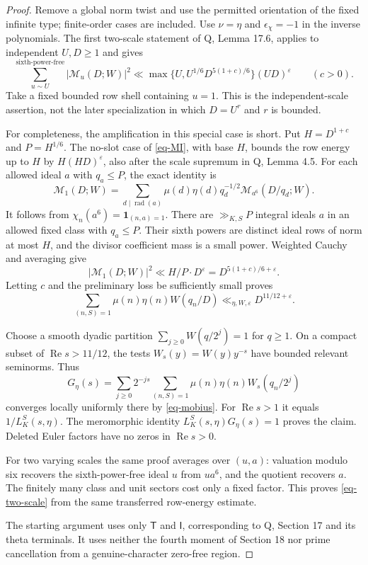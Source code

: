 \documentclass[11pt,a4paper]{article}
\theoremstyle{remark}\newtheorem{remark}[theorem]{Remark}
\newcommand{\Rea}{\operatorname{Re}}
\newcommand{\eps}{\varepsilon}
\newcommand{\one}{\mathbf 1}
\newcommand{\Mcal}{\mathcal M}
\numberwithin{equation}{section}
\begin{document}
\begin{proof}
Remove a global norm twist and use the permitted orientation
of the fixed infinite type; finite-order cases are included. Use $\nu=\eta$ and $\epsilon_\chi=-1$ in the inverse
polynomials. The first two-scale statement of Q, Lemma 17.6, applies
to independent $U,D\ge1$ and gives
\begin{equation}\label{eq-two-scale}
 \sum_{u\sim U}^{\text{sixth-power-free}}
 |\Mcal_u(D;W)|^2
 \ll \max\{U,U^{1/6}D^{5(1+c)/6}\}(UD)^\eps
 \qquad(c>0).
\end{equation}
Take a fixed bounded row shell containing $u=1$. This is the
independent-scale assertion, not the later specialization in which
$D=U^r$ and $r$ is bounded.

For completeness, the amplification in this special case is short.
Put $H=D^{1+c}$ and $P=H^{1/6}$. The no-slot case of
\eqref{eq-MI}, with base $H$, bounds the row energy up to $H$
by $H(HD)^\eps$, also after the scale supremum in Q, Lemma 4.5.
For each allowed ideal $a$ with $q_a\le P$, the exact identity is
\begin{equation}\label{eq-amplification-mask}
 \Mcal_1(D;W)=
 \sum_{d\mid\operatorname{rad}(a)}
       \mu(d)\eta(d)q_d^{-1/2}\Mcal_{a^6}(D/q_d;W).
\end{equation}
It follows from $\chi_n(a^6)=\one_{(n,a)=1}$.
There are $\gg_{K,S}P$ integral ideals $a$ in an allowed
fixed class with $q_a\le P$. Their sixth powers are distinct
ideal rows of norm at most $H$, and the divisor coefficient
mass is a small power. Weighted Cauchy and averaging give
\[
 |\Mcal_1(D;W)|^2\ll H/P\cdot D^\eps
             =D^{5(1+c)/6+\eps}.
\]
Letting $c$ and the preliminary loss be sufficiently small proves
\begin{equation}\label{eq-mobius}
 \sum_{(n,S)=1}\mu(n)\eta(n)W(q_n/D)
       \ll_{\eta,W,\eps}D^{11/12+\eps}.
\end{equation}

Choose a smooth dyadic partition $\sum_{j\ge0}W(q/2^j)=1$
for $q\ge1$. On a compact subset of $\Rea s>11/12$, the tests
$W_s(y)=W(y)y^{-s}$ have bounded relevant seminorms. Thus
\[
 G_\eta(s)=\sum_{j\ge0}2^{-js}
     \sum_{(n,S)=1}\mu(n)\eta(n)W_s(q_n/2^j)
\]
converges locally uniformly there by \eqref{eq-mobius}.
For $\Rea s>1$ it equals $1/L_K^S(s,\eta)$. The meromorphic
identity $L_K^S(s,\eta)G_\eta(s)=1$ proves the claim. Deleted
Euler factors have no zeros in $\Rea s>0$.

For two varying scales the same proof averages over $(u,a)$:
valuation modulo six recovers the sixth-power-free ideal $u$
from $ua^6$, and the quotient recovers $a$. The finitely many
class and unit sectors cost only a fixed factor. This proves
\eqref{eq-two-scale} from the same transferred row-energy estimate.

The starting argument uses only
$\mathsf T$ and $\mathsf I$, corresponding to Q, Section 17
and its theta terminals. It uses neither the fourth moment of Section 18
nor prime cancellation from a genuine-character zero-free region.
\end{proof}
\end{document}
